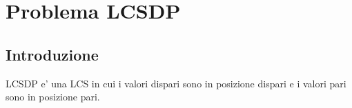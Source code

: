 \chapter{Problema LCSDP}

\section{Introduzione}

LCSDP e' una LCS in cui i valori dispari sono in posizione dispari e i valori pari sono in posizione pari.
